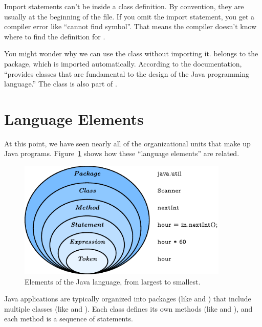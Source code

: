 Import statements can't be inside a class definition.
By convention, they are usually at the beginning of the file.
If you omit the import statement, you get a compiler error like ``cannot find symbol''.
That means the compiler doesn't know where to find the definition for .


You might wonder why we can use the  class without importing it.
 belongs to the  package, which is imported automatically.
According to the documentation,  ``provides classes that are fundamental to the design of the Java programming language.''
The  class is also part of .


\section{Language Elements}


At this point, we have seen nearly all of the organizational units that make up Java programs.
Figure~\ref{fig.package} shows how these ``language elements'' are related.

\begin{figure}[!ht]
\begin{center}
\includegraphics[width=284pt]{figs/package.pdf}
\caption{Elements of the Java language, from largest to smallest.}
\label{fig.package}
\end{center}
\end{figure}


Java applications are typically organized into packages (like  and ) that include multiple classes (like  and ).
Each class defines its own methods (like  and ), and each method is a sequence of statements.

